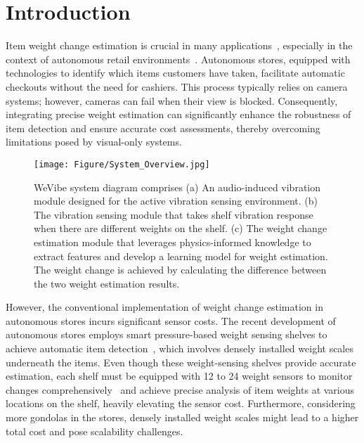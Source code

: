 \section{Introduction}
\label{sec:Section1}
Item weight change estimation is crucial in many applications~\cite{zhang2020vibroscale,he2013food,bonde2021pignet}, especially in the context of autonomous retail environments~\cite{ruiz2019aim3s,falcao2020faim,rohal2024don}. Autonomous stores, equipped with technologies to identify which items customers have taken, facilitate automatic checkouts without the need for cashiers. This process typically relies on camera systems; however, cameras can fail when their view is blocked. Consequently, integrating precise weight estimation can significantly enhance the robustness of item detection and ensure accurate cost assessments, thereby overcoming limitations posed by visual-only systems.

\begin{figure*}[t]
    \centering
    \texttt{[image: Figure/System\_Overview.jpg]}
    \caption{WeVibe system diagram comprises (a) An audio-induced vibration module designed for the active vibration sensing environment. (b) The vibration sensing module that takes shelf vibration response when there are different weights on the shelf. (c) The weight change estimation module that leverages physics-informed knowledge to extract features and develop a learning model for weight estimation. The weight change is achieved by calculating the difference between the two weight estimation results.}
    \label{fig:Figure2}
\end{figure*}

However, the conventional implementation of weight change estimation in autonomous stores incurs significant sensor costs. The recent development of autonomous stores employs smart pressure-based weight sensing shelves to achieve automatic item detection~\cite{ruiz2019aim3s,falcao2021isacs}, which involves densely installed weight scales underneath the items. Even though these weight-sensing shelves provide accurate estimation, each shelf must be equipped with 12 to 24 weight sensors to monitor changes comprehensively~\cite{ruiz2019aim3s,gu2022tracking} and achieve precise analysis of item weights at various locations on the shelf, heavily elevating the sensor cost. Furthermore, considering more gondolas in the stores, densely installed weight scales might lead to a higher total cost and pose scalability challenges.

